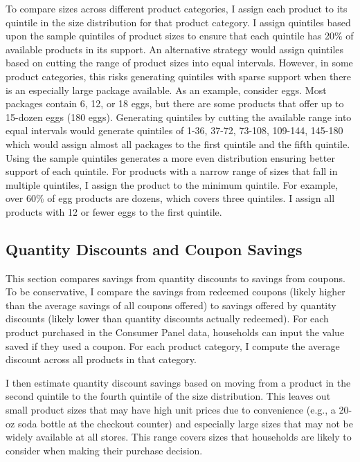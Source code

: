 \documentclass[AER]{AEA_mal}
\begin{document}
To compare sizes across different product categories, I assign each product to its quintile in the size distribution for that product category. I assign quintiles based upon the sample quintiles of product sizes to ensure that each quintile has 20\% of available products in its support. An alternative strategy would assign quintiles based on cutting the range of product sizes into equal intervals. However, in some product categories, this risks generating quintiles with sparse support when there is an especially large package available. As an example, consider eggs. Most packages contain 6, 12, or 18 eggs, but there are some products that offer up to 15-dozen eggs (180 eggs). Generating quintiles by cutting the available range into equal intervals would generate quintiles of 1-36, 37-72, 73-108, 109-144, 145-180 which would assign almost all packages to the first quintile and the fifth quintile. Using the sample quintiles generates a more even distribution ensuring better support of each quintile. For products with a narrow range of sizes that fall in multiple quintiles, I assign the product to the minimum quintile. For example, over 60\% of egg products are dozens, which covers three quintiles. I assign all products with 12 or fewer eggs to the first quintile.

\subsection{Quantity Discounts and Coupon Savings}
\label{coupons}

This section compares savings from quantity discounts to savings from coupons. To be conservative, I compare the savings from redeemed coupons (likely higher than the average savings of all coupons offered) to savings offered by quantity discounts (likely lower than quantity discounts actually redeemed). For each product purchased in the Consumer Panel data, households can input the value saved if they used a coupon. For each product category, I compute the average discount across all products in that category.

I then estimate quantity discount savings based on moving from a product in the second quintile to the fourth quintile of the size distribution. This leaves out small product sizes that may have high unit prices due to convenience (e.g., a 20-oz soda bottle at the checkout counter) and especially large sizes that may not be widely available at all stores. This range covers sizes that households are likely to consider when making their purchase decision.
\end{document}
